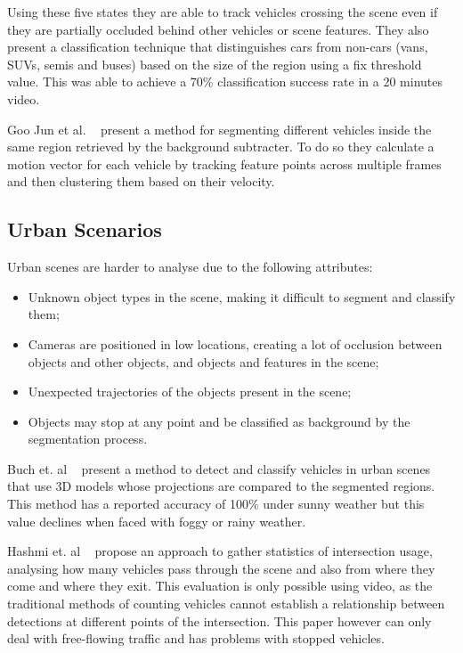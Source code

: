 Using these five states they are able to track vehicles crossing the scene even if they are partially occluded behind other vehicles or scene features. They also present a classification technique that distinguishes cars from non-cars (vans, SUVs, semis and buses) based on the size of the region using a fix threshold value. This was able to achieve a 70\% classification success rate in a 20 minutes video.

Goo Jun et al. ~\cite{jun_tracking_2008} present a method for segmenting different vehicles inside the same region retrieved by the background subtracter. To do so they calculate a motion vector for each vehicle by tracking feature points across multiple frames and then clustering them based on their velocity.

\subsection{Urban Scenarios}

Urban scenes are harder to analyse due to the following attributes:

\begin{itemize}
	\item Unknown object types in the scene, making it difficult to segment and classify them;
	\item Cameras are positioned in low locations, creating a lot of occlusion between objects and other objects, and objects and features in the scene;
	\item Unexpected trajectories of the objects present in the scene;
	\item Objects may stop at any point and be classified as background by the segmentation process.
\end{itemize}

Buch et. al ~\cite{buch_detection_2008} present a method to detect and classify vehicles in urban scenes that use 3D models whose projections are compared to the segmented regions. This method has a reported accuracy of 100\% under sunny weather but this value declines when faced with foggy or rainy weather.

Hashmi et. al ~\cite{hashmi_analysis_2012} propose an approach to gather statistics of intersection usage, analysing how many vehicles pass through the scene and also from where they come and where they exit. This evaluation is only possible using video, as the traditional methods of counting vehicles cannot establish a relationship between detections at different points of the intersection. This paper however can only deal with free-flowing traffic and has problems with stopped vehicles.

